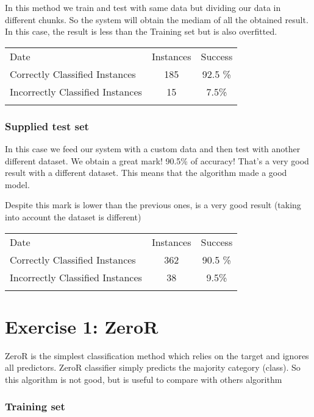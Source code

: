 \documentclass[]{article}
\begin{document}
In this method we train and test with same data but dividing our data in
different chunks. So the system will obtain the mediam of all the
obtained result. In this case, the result is less than the Training set
but is also overfitted.

\begin{longtable}[c]{@{}lcc@{}}
\toprule\addlinespace
Date & Instances & Success
\\\addlinespace
\midrule\endhead
Correctly Classified Instances & 185 & 92.5 \%
\\\addlinespace
Incorrectly Classified Instances & 15 & 7.5\%
\\\addlinespace
\bottomrule
\end{longtable}

\subsubsection{Supplied test set}\label{supplied-test-set}

In this case we feed our system with a custom data and then test with
another different dataset. We obtain a great mark! 90.5\% of accuracy!
That's a very good result with a different dataset. This means that the
algorithm made a good model.

Despite this mark is lower than the previous ones, is a very good result
(taking into account the dataset is different)

\begin{longtable}[c]{@{}lcc@{}}
\toprule\addlinespace
Date & Instances & Success
\\\addlinespace
\midrule\endhead
Correctly Classified Instances & 362 & 90.5 \%
\\\addlinespace
Incorrectly Classified Instances & 38 & 9.5\%
\\\addlinespace
\bottomrule
\end{longtable}

\section{Exercise 1: ZeroR}\label{exercise-1-zeror}

ZeroR is the simplest classification method which relies on the target
and ignores all predictors. ZeroR classifier simply predicts the
majority category (class). So this algorithm is not good, but is useful
to compare with others algorithm

\subsubsection{Training set}\label{training-set-1}
\end{document}
